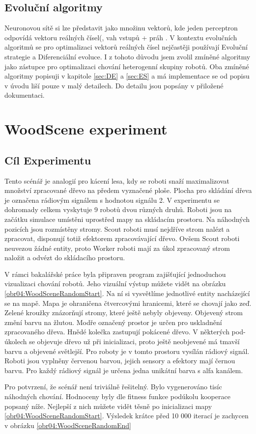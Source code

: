 \subsection{Evoluční algoritmy}
Neuronovou sítě si lze představit jako množinu vektorů, kde jeden perceptron odpovídá vektoru reálných čísel(, vah vstupů + práh . V kontextu evolučních algoritmů se pro optimalizaci vektorů reálných čísel nejčastěji používají Evoluční strategie a Diferenciální evoluce. I z tohoto důvodu jsem zvolil zmíněné algoritmy jako zástupce pro optimalizaci chování heterogenní skupiny robotů. Oba zmíněné algoritmy popisuji v kapitole \ref{sec:DE} a \ref{sec:ES} a má implementace se od popisu v úvodu liší pouze v malý detailech. Do detailu jsou popsány v přiložené dokumentaci. 
\par
\section{WoodScene experiment}
\subsection{Cíl Experimentu}
Tento scénář je analogií pro kácení lesa, kdy se roboti snaží maximalizovat množství zpracované dřevo na předem vyznačené ploše. Plocha pro skládání dřeva je označena rádiovým signálem s hodnotou signálu 2. V experimentu se dohromady celkem vyskytuje 9 robotů dvou různých druhů. Roboti jsou na začátku simulace umístěni uprostřed mapy na skládacím prostoru. Na náhodných pozicích jsou rozmístěny stromy. Scout roboti musí nejdříve strom nalézt a zpracovat, disponují totiž efektorem zpracovávající dřevo. Ovšem Scout roboti neuvezou žádné entity, proto Worker roboti mají za úkol zpracovaný strom naložit a odvézt do skládacího prostoru.
\par
V rámci bakalářské práce byla připraven program zajišťující jednoduchou vizualizaci chování robotů. Jeho vizuální výstup můžete vidět na obrázku \ref{obr04:WoodSceneRandomStart}. Na ní si vysvětlíme jednotlivé entity nacházející se na mapě. Mapa je ohraničena čtvercovými hranicemi, které se chovají jako zeď. Zelené kroužky znázorňují stromy, které ještě nebyly objeveny. Objevený strom změní barvu na žlutou. Modře označený prostor je určen pro uskladnění zpracovaného dřeva. Hnědé kolečka zastupují pokácené dřevo. V některých pod-úkolech se objevuje dřevo už při inicializaci, proto ještě neobjevené má tmavší barvu a objevené světlejší. Pro roboty je v tomto prostoru vysílán rádiový signál. Roboti jsou vyplněny červenou barvou, jejich sensory a efektory mají černou barvu. Pro každý rádiový signál je určena jedna unikátní barva s alfa kanálem. \par
Pro potvrzení, že scénář není triviálně řešitelný. Bylo vygenerováno tisíc náhodných chování. Hodnoceny byly dle fitness funkce podúkolu kooperace popsaný níže. Nejlepší z nich můžete vidět těsně po inicializaci mapy \ref{obr04:WoodSceneRandomStart}. Výsledek krátce před 10 000 iterací je zachycen v obrázku \ref{obr04:WoodSceneRandomEnd}

